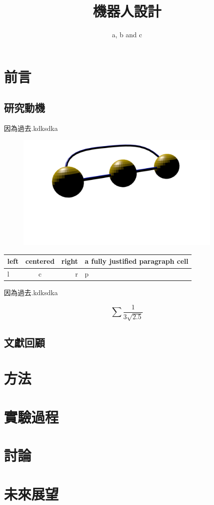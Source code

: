 \documentclass[12pt, a4paper,twoside]{report}
\begin{document}
\title{機器人設計}                                                                                                                                                                                        
\author{a, b and c}

\maketitle
\tableofcontents
\vfill

\chapter{前言}
\section{研究動機}
因為過去.kdksdka  


\begin{figure}[htbp]
\begin{center}
\includegraphics[width=0.9\textwidth]{figure/teach}
\caption{}
\label{}
\end{center}
\end{figure}





\begin{tabular}{|l|c|r|p{1.7cm}|}
  \hline
  left & centered & right & a fully justified paragraph cell\\
  \hline
  l & c & r & p\\
  \hline
\end{tabular}

因為過去.kdksdka  

\begin{equation}
\sum\frac{1}{3\sqrt{2.5}}
\end{equation}

\section{文獻回顧}
\chapter{方法}
\chapter{實驗過程}
\chapter{討論}
\chapter{未來展望}
\end{document}
